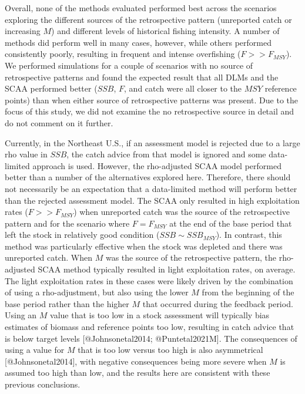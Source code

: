 \documentclass[
  12pt,
]{article}
\begin{document}
Overall, none of the methods evaluated performed best across the scenarios exploring the different sources of the retrospective pattern (unreported catch or increasing \(M\)) and different levels of historical fishing intensity. A number of methods did perform well in many cases, however, while others performed consistently poorly, resulting in frequent and intense overfishing (\(F>>F_{MSY}\)). We performed simulations for a couple of scenarios with no source of retrospective patterns and found the expected result that all DLMs and the SCAA performed better (\(SSB\), \(F\), and catch were all closer to the \(MSY\) reference points) than when either source of retrospective patterns was present. Due to the focus of this study, we did not examine the no retrospective source in detail and do not comment on it further.

Currently, in the Northeast U.S., if an assessment model is rejected due to a large rho value in \(SSB\), the catch advice from that model is ignored and some data-limited approach is used. However, the rho-adjusted SCAA model performed better than a number of the alternatives explored here. Therefore, there should not necessarily be an expectation that a data-limited method will perform better than the rejected assessment model. The SCAA only resulted in high exploitation rates (\(F >> F_{MSY}\)) when unreported catch was the source of the retrospective pattern and for the scenario where \(F=F_{MSY}\) at the end of the base period that left the stock in relatively good condition (\(SSB \sim SSB_{MSY}\)). In contrast, this method was particularly effective when the stock was depleted and there was unreported catch. When \(M\) was the source of the retrospective pattern, the rho-adjusted SCAA method typically resulted in light exploitation rates, on average. The light exploitation rates in these cases were likely driven by the combination of using a rho-adjustment, but also using the lower \(M\) from the beginning of the base period rather than the higher \(M\) that occurred during the feedback period. Using an \(M\) value that is too low in a stock assessment will typically bias estimates of biomass and reference points too low, resulting in catch advice that is below target levels {[}@Johnsonetal2014; @Puntetal2021M{]}. The consequences of using a value for \(M\) that is too low versus too high is also asymmetrical {[}@Johnsonetal2014{]}, with negative consequences being more severe when \(M\) is assumed too high than low, and the results here are consistent with these previous conclusions.
\end{document}
